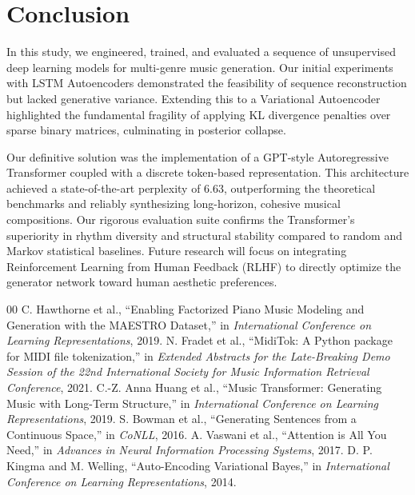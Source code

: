\documentclass[conference]{IEEEtran}
\begin{document}
\section{Conclusion}
In this study, we engineered, trained, and evaluated a sequence of unsupervised deep learning models for multi-genre music generation. Our initial experiments with LSTM Autoencoders demonstrated the feasibility of sequence reconstruction but lacked generative variance. Extending this to a Variational Autoencoder highlighted the fundamental fragility of applying KL divergence penalties over sparse binary matrices, culminating in posterior collapse.

Our definitive solution was the implementation of a GPT-style Autoregressive Transformer coupled with a discrete token-based representation. This architecture achieved a state-of-the-art perplexity of 6.63, outperforming the theoretical benchmarks and reliably synthesizing long-horizon, cohesive musical compositions. Our rigorous evaluation suite confirms the Transformer's superiority in rhythm diversity and structural stability compared to random and Markov statistical baselines. Future research will focus on integrating Reinforcement Learning from Human Feedback (RLHF) to directly optimize the generator network toward human aesthetic preferences.

\begin{thebibliography}{00}
 C. Hawthorne et al., ``Enabling Factorized Piano Music Modeling and Generation with the MAESTRO Dataset,'' in \textit{International Conference on Learning Representations}, 2019.
 N. Fradet et al., ``MidiTok: A Python package for MIDI file tokenization,'' in \textit{Extended Abstracts for the Late-Breaking Demo Session of the 22nd International Society for Music Information Retrieval Conference}, 2021.
 C.-Z. Anna Huang et al., ``Music Transformer: Generating Music with Long-Term Structure,'' in \textit{International Conference on Learning Representations}, 2019.
 S. Bowman et al., ``Generating Sentences from a Continuous Space,'' in \textit{CoNLL}, 2016.
 A. Vaswani et al., ``Attention is All You Need,'' in \textit{Advances in Neural Information Processing Systems}, 2017.
 D. P. Kingma and M. Welling, ``Auto-Encoding Variational Bayes,'' in \textit{International Conference on Learning Representations}, 2014.
\end{thebibliography}
\end{document}
